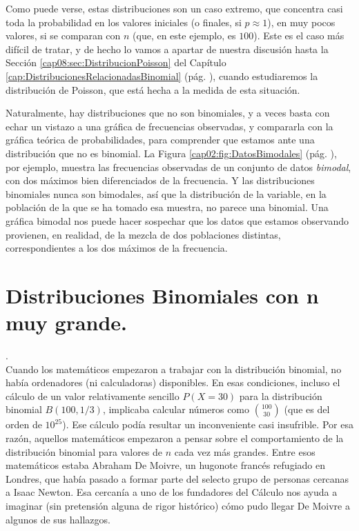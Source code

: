 \begin{enumerate}
      Como puede verse, estas distribuciones son un caso extremo, que concentra casi toda la probabilidad en los valores iniciales (o finales, si $p\approx 1$), en muy pocos valores, si se comparan con $n$ (que, en este ejemplo, es $100$). Este es el caso más difícil de tratar, y de hecho lo vamos a apartar de nuestra discusión hasta la Sección \ref{cap08:sec:DistribucionPoisson} del Capítulo \ref{cap:DistribucionesRelacionadasBinomial} (pág. \pageref{cap08:sec:DistribucionPoisson}), cuando estudiaremos la distribución de Poisson, que está hecha a la medida de esta situación.
\end{enumerate}

Naturalmente, hay distribuciones que no son binomiales, y a veces basta con echar un vistazo a una gráfica de frecuencias observadas, y compararla con la gráfica teórica de probabilidades, para comprender que estamos ante una distribución que no es binomial. La Figura \ref{cap02:fig:DatosBimodales} (pág. \pageref{cap02:fig:DatosBimodales}), por ejemplo, muestra las frecuencias observadas de un conjunto de datos {\em bimodal}, con dos máximos bien diferenciados de la frecuencia. Y las distribuciones binomiales nunca son bimodales, así que la distribución de la variable, en la población de la que se ha tomado esa muestra, no parece una binomial. Una gráfica bimodal nos puede hacer sospechar que los datos que estamos observando provienen, en realidad, de la mezcla de dos poblaciones distintas, correspondientes a los dos máximos de la frecuencia.

\section{Distribuciones Binomiales con n muy grande.}\label{sec:DistribucionesBinomialesnGrande}


.\\

Cuando los matemáticos empezaron a trabajar con la distribución binomial, no había ordenadores (ni calculadoras) disponibles. En esas condiciones, incluso el cálculo de un valor relativamente sencillo $P(X=30)$ para la distribución binomial $B(100,1/3)$, implicaba calcular números como $\binom{100}{30}$ (que es del orden de $10^{25}$). Ese cálculo podía resultar un inconveniente casi insufrible. Por esa razón, aquellos matemáticos empezaron a pensar sobre el comportamiento de la distribución binomial para valores de $n$ cada vez más grandes. Entre esos matemáticos estaba Abraham De Moivre, un hugonote francés refugiado en Londres, que había pasado a formar parte del selecto grupo de personas cercanas a Isaac Newton. Esa cercanía a uno de los fundadores del Cálculo nos ayuda a imaginar (sin pretensión alguna de rigor histórico) cómo pudo llegar De Moivre a algunos de sus hallazgos.

